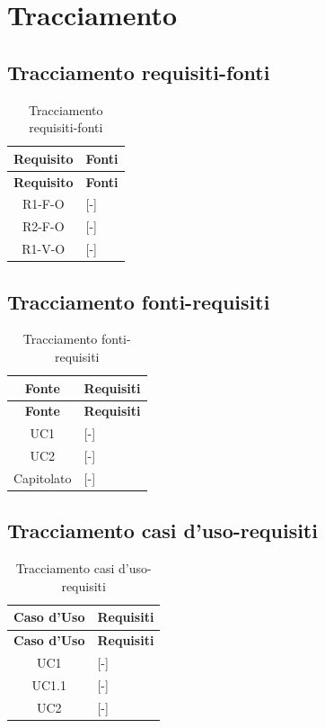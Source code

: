 \section{Tracciamento}

\subsection{Tracciamento requisiti-fonti}
\begin{longtable}{|c|p{10cm}|}
	\caption{Tracciamento requisiti-fonti} \\
	\hline
	\rowcolor{primarycolor!10}
	\textbf{Requisito} & \textbf{Fonti} \\
	\hline
	\endfirsthead
	
	\hline
	\rowcolor{primarycolor!10}
	\textbf{Requisito} & \textbf{Fonti} \\
	\hline
	\endhead
	
	R1-F-O & [-] \\ \hline
	R2-F-O & [-] \\ \hline
	R1-V-O & [-] \\ \hline
\end{longtable}

\subsection{Tracciamento fonti-requisiti}
\begin{longtable}{|c|p{10cm}|}
	\caption{Tracciamento fonti-requisiti} \\
	\hline
	\rowcolor{primarycolor!10}
	\textbf{Fonte} & \textbf{Requisiti} \\
	\hline
	\endfirsthead
	
	\hline
	\rowcolor{primarycolor!10}
	\textbf{Fonte} & \textbf{Requisiti} \\
	\hline
	\endhead
	
	UC1 & [-] \\ \hline
	UC2 & [-] \\ \hline
	Capitolato & [-] \\ \hline
\end{longtable}

\subsection{Tracciamento casi d'uso-requisiti}
\begin{longtable}{|c|p{10cm}|}
	\caption{Tracciamento casi d'uso-requisiti} \\
	\hline
	\rowcolor{primarycolor!10}
	\textbf{Caso d'Uso} & \textbf{Requisiti} \\
	\hline
	\endfirsthead
	
	\hline
	\rowcolor{primarycolor!10}
	\textbf{Caso d'Uso} & \textbf{Requisiti} \\
	\hline
	\endhead
	
	UC1 & [-] \\ \hline
	UC1.1 & [-] \\ \hline
	UC2 & [-] \\ \hline
\end{longtable}